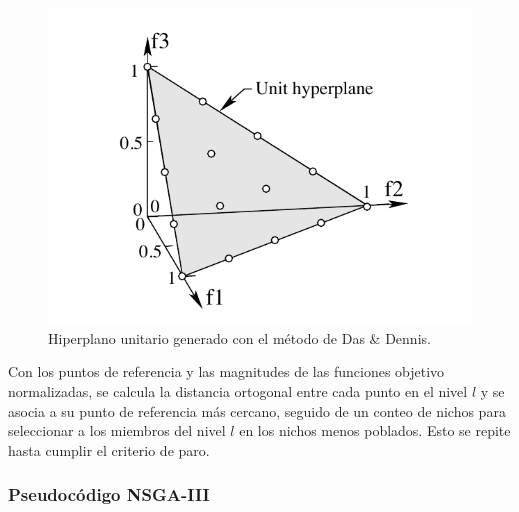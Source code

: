 \documentclass[letterpaper,10pt]{article}
\begin{document}
\begin{figure}[h]
 \centering
\includegraphics[scale=0.35]{hyper.png}
\caption{Hiperplano unitario generado con el método de Das \& Dennis.}
\end{figure}
Con los puntos de referencia y las magnitudes de las funciones objetivo normalizadas, se calcula la distancia ortogonal entre cada punto en el nivel $l$ y se asocia a su punto de referencia más cercano,
seguido de un conteo de nichos para seleccionar a los miembros del nivel $l$ en los nichos menos poblados. Esto se repite hasta cumplir el criterio de paro.


\subsubsection{Pseudocódigo NSGA-III}
 
\end{document}
